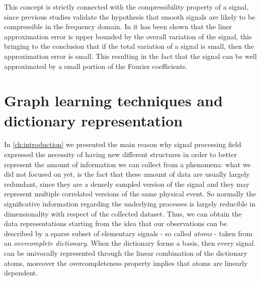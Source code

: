This concept is strictly connected with the compressibility property of a signal, since previous studies validate the hypothesis that smooth signals are likely to be compressible in the frequency domain. In \cite{Zhu2012} it has been shown that the liner approximation error is upper bounded by the overall variation of the signal, this bringing to the conclusion that if the total variation of a signal is small, then the approximation error is small. This resulting in the fact that the signal can be well approximated by a small portion of the Fourier coefficients.

\section{Graph learning techniques and dictionary representation}
In \autoref{ch:introduction} we presented the main reason why signal processing field expressed the necessity of having new different structures in order to better represent the amount of information we can collect from a phenomena: what we did not focused on yet, is the fact that these amount of data are usually largely redundant, since they are a densely sampled version of the signal and they may represent multiple correlated versions of the same physical event. So normally the significative information regarding the underlying processes is largely reducible in dimensionality with respect of the collected dataset. \cite{Tosic2011} Thus, we can obtain the data representations starting from the idea that our observations can be described by a sparse subset of elementary signals - so called \textit{atoms} - taken from an \textit{overcomplete dictionary}. When the dictionary forms a basis, then every signal can be univocally represented through the linear combination of the dictionary atoms, moreover the overcompleteness property implies that atoms are linearly dependent. \cite{Tosic2011} \cite{Rubinstein2010}

